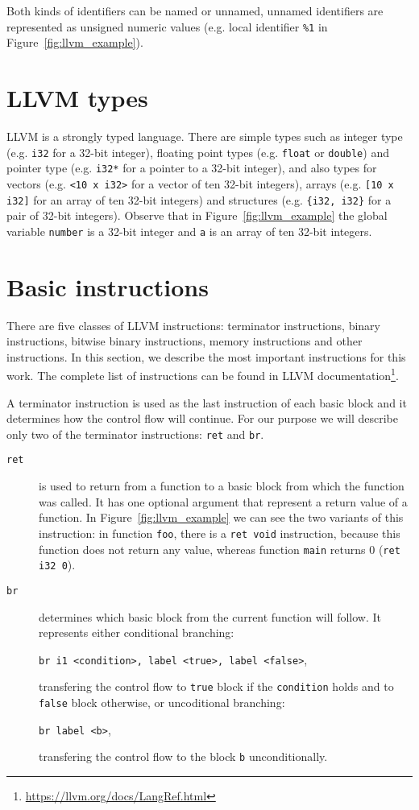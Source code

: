 Both kinds of identifiers can be named or unnamed, unnamed identifiers are
represented as unsigned numeric values (e.g. local identifier \texttt{\%1} in
Figure~\ref{fig:llvm_example}).

\section{LLVM types}

LLVM is a strongly typed language. There are simple types such as integer type
(e.g. \texttt{i32} for a 32-bit integer), floating point types (e.g.
\texttt{float} or \texttt{double}) and pointer type (e.g. \texttt{i32*} for a
pointer to a 32-bit integer), and also types for vectors (e.g. \texttt{<10 x
i32>} for a vector of ten 32-bit integers), arrays (e.g. \texttt{[10 x i32]}
for an array of ten 32-bit integers) and structures (e.g. \texttt{\{i32, i32\}}
for a pair of 32-bit integers). Observe that in Figure~\ref{fig:llvm_example}
the global variable \texttt{number} is a 32-bit integer and
\texttt{a} is an array of ten 32-bit integers.

\section{Basic instructions}

There are five classes of LLVM instructions: terminator instructions, binary
instructions, bitwise binary instructions, memory instructions and other
instructions. In this section, we describe the most important instructions for
this work. The complete list of instructions can be found in LLVM
documentation\footnote{\url{https://llvm.org/docs/LangRef.html}}.

A terminator instruction is used as the last instruction of each basic block
and it determines how the control flow will continue. For our purpose we will
describe only two of the terminator instructions: \texttt{ret} and \texttt{br}.

\begin{description}
\item[\texttt{ret}] is used to return from a function to a basic block
from which the function was called. It has one optional argument that represent
a return value of a function. In Figure~\ref{fig:llvm_example} we can see the
two variants of this instruction: in function \texttt{foo}, there is a
\texttt{ret void} instruction, because this function does not return any value,
whereas function \texttt{main} returns 0 (\texttt{ret i32 0}).

\item[\texttt{br}] determines which basic block from the current function
will follow. It represents either conditional branching:

\texttt{br i1 <condition>, label <true>, label <false>},

transfering the control flow to \texttt{true} block if the \texttt{condition} holds and to
\texttt{false} block otherwise, or uncoditional branching:

\texttt{br label <b>},

transfering the control flow to the block \texttt{b} unconditionally.
\end{description}

